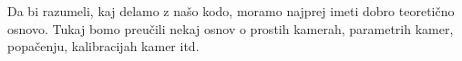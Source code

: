 Da bi razumeli, kaj delamo z našo kodo, moramo najprej imeti dobro teoretično osnovo. Tukaj bomo preučili nekaj osnov o prostih kamerah, parametrih kamer, popačenju, kalibracijah kamer itd.